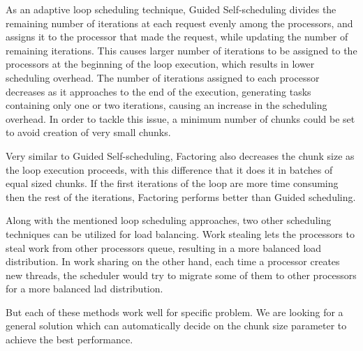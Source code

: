 As an adaptive loop scheduling technique, Guided Self-scheduling\cite{polychronopoulos1987guided} divides the remaining number of iterations at each request evenly among the processors, and assigns it to the processor that made the request, while updating the number of remaining iterations. This causes larger number of iterations to be assigned to the processors at the beginning of the loop execution, which results in lower scheduling overhead. The number of iterations assigned to each processor decreases as it approaches to the end of the execution, generating tasks containing only one or two iterations, causing an increase in the scheduling overhead. In order to tackle this issue, a minimum number of chunks could be set to avoid creation of very small chunks\cite{lilja1994exploiting}. 

Very similar to Guided Self-scheduling, Factoring\cite{hummel1992factoring} also decreases the chunk size as the loop execution proceeds, with this difference that it does it in batches of equal sized chunks. If the first iterations of the loop are more time consuming then the rest of the iterations, Factoring performs better than Guided scheduling\cite{mohammed2018experimental}.  


Along with the mentioned loop scheduling approaches, two other scheduling techniques can be utilized for load balancing. Work stealing\cite{blumofe1999scheduling} lets the processors to steal work from other processors queue, resulting in a more balanced load distribution. In work sharing on the other hand, each time a processor creates new threads, the scheduler would try to migrate some of them to other processors for a more balanced lad distribution\cite{blumofe1999scheduling}.



But each of these methods work well for specific problem. We are looking for a general solution which can automatically decide on the chunk size parameter to achieve the best performance.

\vspace{\baselineskip}	